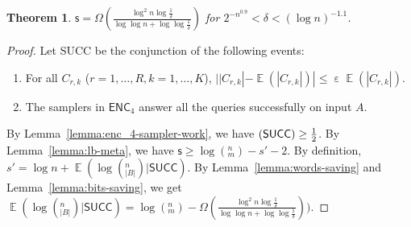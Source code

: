 \documentclass[10pt]{article}
\DeclareMathOperator*{\E}{\mathbb{E}}
\let\Pr\relax
\DeclareMathOperator*{\Pr}{\mathbb{P}}
\DeclareMathOperator*{\eps}{\varepsilon}
\newtheorem{theorem}{Theorem}
\newcommand{\success}{\textsf{SUCC}\xspace}
\newcommand{\enc}{\textsf{ENC}\xspace}
\newcommand{\s}{\textsf{s}\xspace}
\begin{document}
\begin{theorem}
  $\s = \Omega(\frac{\log^2 n\log{\frac{1}{\delta}}}{\log\log n+\log\log \frac{1}{\delta}})$ for $2^{-n^{0.9}}<\delta<(\log n)^{-1.1}$.
\end{theorem}

\begin{proof}
  Let \success be the conjunction of the following events:
  \begin{enumerate}
    \item For all $C_{r,k}$ ($r=1,\ldots, R, k=1,\ldots, K$), $||C_{r,k}|-\E(|C_{r,k}|)|\le \eps \E(|C_{r,k}|)$.
    \item The samplers in $\enc_4$ answer all the queries successfully on input $A$.
  \end{enumerate}
  By Lemma~\ref{lemma:enc_4-sampler-work}, we have $\Pr(\success)\ge \frac{1}{2}$. By Lemma~\ref{lemma:lb-meta}, we have $\s\ge \log (^n_m) - s' -2$. By definition, $s'=\log n + \E(\log (^n_{|B|})|\success)$. By Lemma~\ref{lemma:words-saving} and Lemma~\ref{lemma:bits-saving}, we get $\E(\log (^n_{|B|})|\success)=\log (^n_m)-\Omega(\frac{\log^2 n\log{\frac{1}{\delta}}}{\log\log n+\log\log \frac{1}{\delta}}))$. 
\end{proof}



\end{document}
